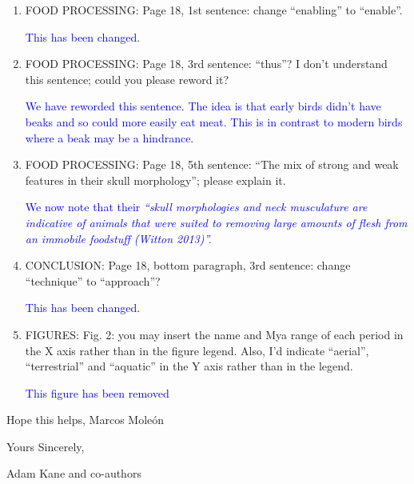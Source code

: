 \documentclass[12pt,letterpaper]{article}
\begin{document}
\begin{enumerate}
\item{FOOD PROCESSING:} Page 18, 1st sentence: change ``enabling'' to ``enable''.

\textcolor{blue}{This has been changed.}

\item{FOOD PROCESSING:} Page 18, 3rd sentence: ``thus''? I don't understand this sentence; could you please reword it?

\textcolor{blue}{We have reworded this sentence. The idea is that early birds didn't have beaks and so could more easily eat meat. This is in contrast to modern birds where a beak may be a hindrance.}

\item{FOOD PROCESSING:} Page 18, 5th sentence: ``The mix of strong and weak features in their skull morphology''; please explain it.

\textcolor{blue}{We now note that their \textit{``skull morphologies and neck musculature are indicative of animals that were suited to removing large amounts of flesh from an immobile foodstuff (Witton 2013)''.}}

\item{CONCLUSION:} Page 18, bottom paragraph, 3rd sentence: change ``technique'' to ``approach''?

\textcolor{blue}{This has been changed.}

\item{FIGURES:} Fig. 2: you may insert the name and Mya range of each period in the X axis rather than in the figure legend. Also, I'd indicate ``aerial'', ``terrestrial'' and ``aquatic'' in the Y axis rather than in the legend.

\textcolor{blue}{This figure has been removed}

\end{enumerate}

Hope this helps,
Marcos Mole\'{o}n

\bigskip
\bigskip
\bigskip
\bigskip
\bigskip
\bigskip
\bigskip
\bigskip

Yours Sincerely,
\bigskip

Adam Kane and co-authors 

\end{document}
